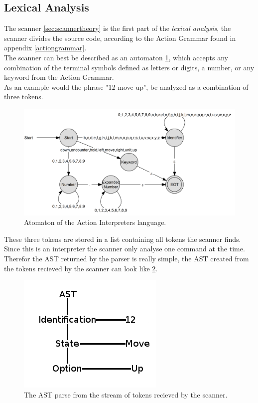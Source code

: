 \subsection{Lexical Analysis}
The scanner \ref{sec:scannertheory} is the first part of the \textit{lexical analysis}, the scanner divides the source code, according to the Action Grammar found in appendix \ref{actiongrammar}.\\
The scanner can best be described as an automaton \ref{pic:action_atomaton}, which accepts any combination of the terminal symbols defined as letters or digits, a number, or any keyword from the Action Grammar.\\
As an example would the phrase "12 move up", be analyzed as a combination of three tokens.\\

\begin{figure}[h]
\begin{center}
\includegraphics[scale=0.15]{Images/actioninterpreter/ai_automaton.png}
\caption{Atomaton of the Action Interpreters language.}
\label{pic:action_atomaton}
\end{center}
\end{figure}

These three tokens are stored in a list containing all tokens the scanner finds. Since this is an interpreter the scanner only analyse one command at the time.\\
Therefor the AST returned by the parser is really simple, the AST created from the tokens recieved by the scanner  can look like \ref{pic:ai_parser_ast}.

\begin{figure}[h]
\begin{center}
\includegraphics[scale=0.5]{Images/actioninterpreter/AST.png}
\end{center}
\caption{The AST parse from the stream of tokens recieved by the scanner.}
\label{pic:ai_parser_ast}
\end{figure}

